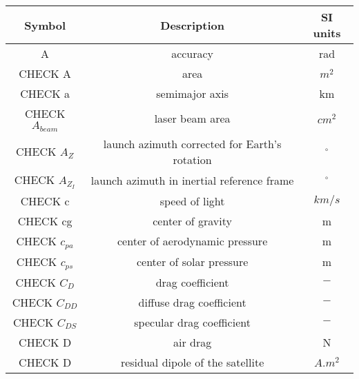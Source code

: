 \begin{center}
\begin{longtable}{c|c|c}

\textbf{Symbol} & \textbf{Description} & \textbf{SI units} \\\hline\hline
A																		& accuracy 																		& rad \\

CHECK A																		& area 																				& $m^2$ \\

CHECK a																		& semimajor axis 															& km \\

CHECK $A_{beam}$                        & laser beam area                               & $cm^2$ \\

CHECK $A_Z$                           & launch azimuth corrected for Earth's rotation  & $^\circ$ \\

CHECK $A_{Z_I}$                           & launch azimuth in inertial reference frame  & $^\circ$ \\

CHECK c                                     & speed of light                            & $km/s$ \\

CHECK cg                                    & center of gravity                         & m \\

CHECK $c_{pa}$                              & center of aerodynamic pressure            & m \\

CHECK $c_{ps}$                             & center of solar pressure                   & m \\

CHECK $C_D$																& drag coefficient 														& $-$ \\

CHECK $C_{DD}$													        & diffuse drag coefficient							& $-$ \\

CHECK $C_{DS}$						       								& specular drag coefficient 						& $-$ \\

CHECK D																		& air drag 																		& N \\

CHECK D                                 & residual dipole of the satellite               & $A.m^2$ \\


\end{longtable}
\end{center}
